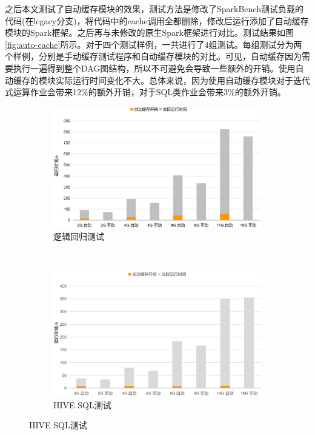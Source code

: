 之后本文测试了自动缓存模块的效果，测试方法是修改了SparkBench测试负载的代码(在legacy分支)，将代码中的cache调用全都删除，修改后运行添加了自动缓存模块的Spark框架。之后再与未修改的原生Spark框架进行对比。测试结果如图\ref{fig:auto-cache}所示。对于四个测试样例，一共进行了4组测试。每组测试分为两个样例，分别是手动缓存测试程序和自动缓存模块的对比。可见，自动缓存因为需要执行一遍得到整个DAG图结构，所以不可避免会导致一些额外的开销。使用自动缓存的模块实际运行时间变化不大。总体来说，因为使用自动缓存模块对于迭代式运算作业会带来12\%的额外开销，对于SQL类作业会带来3\%的额外开销。
\begin{figure}
    \centering
    \begin{subfigure}[b]{0.45\linewidth}
      \includegraphics[width=\textwidth]{Img/lr1.jpg}
      \caption{逻辑回归测试}
      \label{fig:lr-auto-cache}
    \end{subfigure}%
    ~%
    \begin{subfigure}[b]{0.45\linewidth}
      \includegraphics[width=\textwidth]{Img/hive1.jpg}
      \caption{HIVE SQL测试}
      \label{fig:hive-auto-cache}

\end{subfigure}
\end{figure}
